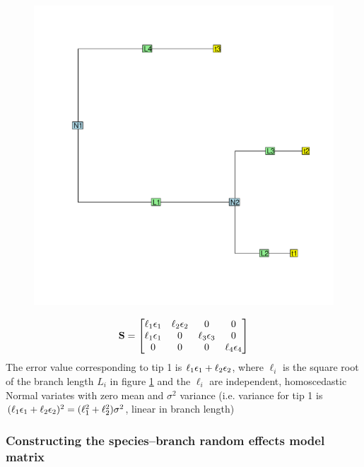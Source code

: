 \documentclass[12pt]{article}
\begin{document}
\begin{center}
\begin{figure}[h]
  \includegraphics[scale=0.8,page=1]{./git_push/tree.pdf}
  \caption{}
\label{fig:tree}
\end{figure}
\end{center}

\begin{align*}
{\mathbf S} = \begin{bmatrix}
\ell_1 { \epsilon}_1 & \ell_2 { \epsilon}_2 & 0 & 0 \\
\ell_1 { \epsilon}_1 &  0 & \ell_3 { \epsilon}_3 & 0 \\
0  &  0 & 0  & \ell_4 { \epsilon}_4
\end{bmatrix}
\end{align*}
The error value corresponding to tip 1 is $\ell_1 { \epsilon}_1 + \ell_2 { \epsilon}_2$, where $\ell_i$ is the square root of the branch length $L_i$ in figure \ref{fig:tree} and the $\ell_i$ are independent, homoscedastic Normal variates with zero mean and $\sigma^2$ variance (i.e. variance for tip 1 is $(\ell_1 { \epsilon}_1 + \ell_2 { \epsilon}_2)^2 = (\ell_1^2 + \ell_2^2)\sigma^2$, linear in branch length) 

\subsubsection*{Constructing the species--branch random effects model matrix}
\end{document}
